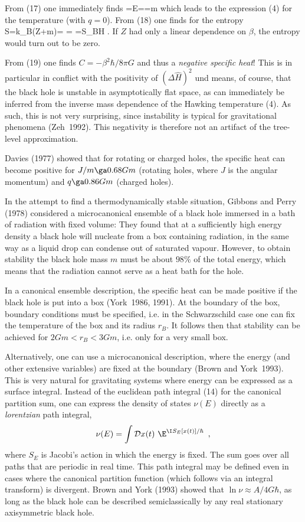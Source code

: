 {}From (17) one immediately finds
\be \langle{}\rangle =E==m
    \ee
which leads to the expression (4) for the temperature (with $q=0$).
{}From (18) one finds for the entropy
\be S=k_B(\ln Z+\beta m)= =
    =S_{BH} \enspace . \ee
If $Z$ had only a linear dependence on $\beta$, the entropy
would turn out to be zero.

{}From (19) one finds $C=-\beta^2\hbar/8\pi G$ and thus a {\em negative
specific heat}! This is in particular in conflict with the
positivity of $(\Delta\hat{H})^2$ und means, of course,
 that the black hole is unstable in asymptotically flat space,
as can immediately be inferred from the inverse mass dependence
of the Hawking temperature (4). As such, this is not very surprising,
since instability is typical for gravitational phenomena
(Zeh~1992). This negativity is therefore not an artifact of the
tree-level approximation.

\vskip 2mm
\small

Davies (1977) showed that for rotating or charged holes,
the specific heat can become positive for $J/m\ga 0.68Gm$
(rotating holes, where $J$ is the angular momentum) and
$q\ga 0.86Gm$ (charged holes).

\vskip 2mm
\normalsize

In the attempt to find a thermodynamically stable situation,
Gibbons and Perry (1978) considered a microcanonical ensemble
of a black hole immersed in a bath of radiation with fixed volume:
 They found that at a sufficiently
high energy density a black hole will nucleate from
a box containing radiation, in the same way as a liquid drop
can condense out of saturated vapour. However, to obtain stability
the black hole mass $m$ must be about $98\%$ of the total energy,
which means that the radiation cannot serve as a heat bath for
the hole.

In a canonical ensemble description, the specific heat can be made
positive if the black hole is put into a box (York~1986, 1991).
At the boundary of the box, boundary conditions must be specified,
i.e. in the Schwarzschild case
 one can fix the temperature of the box and its radius $r_B$. 
It follows then that stability can be achieved 
for $2Gm < r_B < 3Gm$, i.e. only for a very small box.

Alternatively, one can use a microcanonical description, where the
energy (and other extensive variables) are fixed at the boundary
(Brown and York~1993). This is very natural for gravitating
systems where energy can be expressed as a surface integral.
Instead of the euclidean path integral (14) for the canonical
partition sum, one can express the density of states $\nu(E)$
directly as a {\em lorentzian} path integral,
\[ \nu(E)= \int{\cal D}x(t)\ \E^{\I S_E[x(t)]/\hbar}
    \enspace , \]
where $S_E$ is Jacobi's action in which the energy is fixed. The sum
goes over all paths that are periodic in real time. This path integral
may be defined even in cases where the canonical partition function
(which follows via an integral transform) is divergent.
Brown and York (1993) showed that $\ln\nu\approx A/4G\hbar$, as long
as the black hole can be described semiclassically by any real
stationary axisymmetric black hole.

